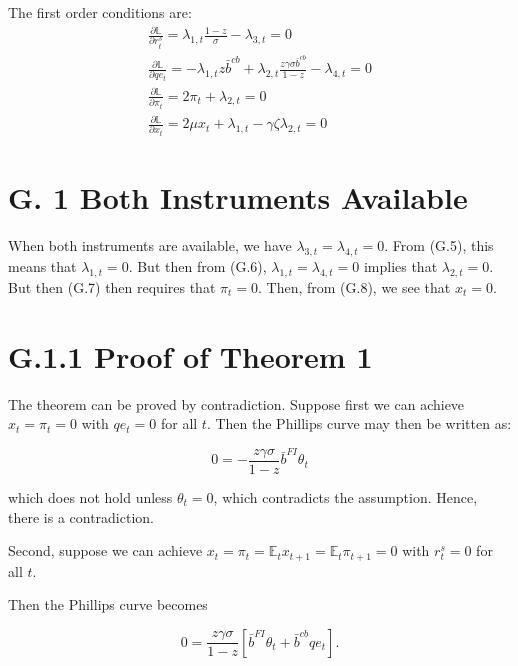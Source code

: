 \documentclass[10pt]{article}
\begin{document}
The first order conditions are:\\
\begin{gather*}
\frac{\partial \mathbb{L}}{\partial r_{t}^{s}}=\lambda_{1, t} \frac{1-z}{\sigma}-\lambda_{3, t}=0  \tag{G.5}\\
\frac{\partial \mathbb{L}}{\partial q e_{t}}=-\lambda_{1, t} z \bar{b}^{c b}+\lambda_{2, t} \frac{z \gamma \sigma \bar{b}^{c b}}{1-z}-\lambda_{4, t}=0  \tag{G.6}\\
\frac{\partial \mathbb{L}}{\partial \pi_{t}}=2 \pi_{t}+\lambda_{2, t}=0  \tag{G.7}\\
\frac{\partial \mathbb{L}}{\partial x_{t}}=2 \mu x_{t}+\lambda_{1, t}-\gamma \zeta \lambda_{2, t}=0 \tag{G.8}
\end{gather*}

\section*{G. 1 Both Instruments Available}
When both instruments are available, we have $\lambda_{3, t}=\lambda_{4, t}=0$. From (G.5), this means that $\lambda_{1, t}=0$. But then from (G.6), $\lambda_{1, t}=\lambda_{4, t}=0$ implies that $\lambda_{2, t}=0$. But then (G.7) then requires that $\pi_{t}=0$. Then, from (G.8), we see that $x_{t}=0$.

\section*{G.1.1 Proof of Theorem 1}
The theorem can be proved by contradiction. Suppose first we can achieve $x_{t}=\pi_{t}=0$ with $q e_{t}=0$ for all $t$. Then the Phillips curve may then be written as:

\begin{equation*}
0=-\frac{z \gamma \sigma}{1-z} \bar{b}^{F I} \theta_{t} \tag{G.9}
\end{equation*}

which does not hold unless $\theta_{t}=0$, which contradicts the assumption. Hence, there is a contradiction.

Second, suppose we can achieve $x_{t}=\pi_{t}=\mathbb{E}_{t} x_{t+1}=\mathbb{E}_{t} \pi_{t+1}=0$ with $r_{t}^{s}=0$ for all $t$.

Then the Phillips curve becomes

\begin{equation*}
0=\frac{z \gamma \sigma}{1-z}\left[\bar{b}^{F I} \theta_{t}+\bar{b}^{c b} q e_{t}\right] . \tag{G.10}
\end{equation*}
\end{document}
